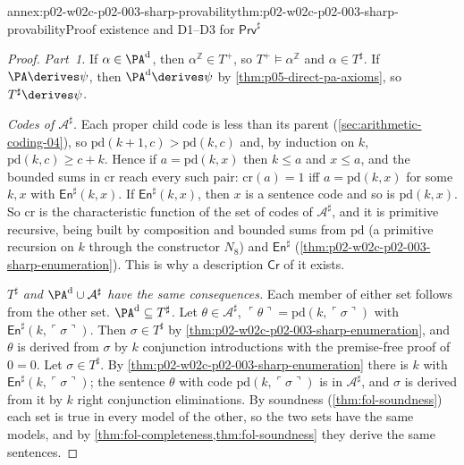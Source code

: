 \begin{annexitem}{annex:p02-w02c-p02-003-sharp-provability}{thm:p02-w02c-p02-003-sharp-provability}{Proof existence and D1--D3 for \(\mathsf{Prv}^{\sharp}\)}
\begin{proof}
\emph{Part~1.}  If \(\alpha\in\PA^{\rm d}\), then
\(\alpha^{\mathbb Z}\in T^{+}\), so \(T^{+}\models\alpha^{\mathbb Z}\) and
\(\alpha\in T^{\sharp}\).  If \(\PA\derives\psi\), then
\(\PA^{\rm d}\derives\psi\) by \cref{thm:p05-direct-pa-axioms}, so
\(T^{\sharp}\derives\psi\).

\emph{Codes of \(\mathcal A^{\sharp}\).}  Each proper child code is less
than its parent (\cref{sec:arithmetic-coding-04}), so
\(\mathrm{pd}(k+1,c)>\mathrm{pd}(k,c)\) and, by induction on \(k\),
\(\mathrm{pd}(k,c)\ge c+k\).  Hence if \(a=\mathrm{pd}(k,x)\) then
\(k\le a\) and \(x\le a\), and the bounded sums in \(\mathrm{cr}\) reach
every such pair: \(\mathrm{cr}(a)=1\) iff \(a=\mathrm{pd}(k,x)\) for some
\(k,x\) with \(\mathsf{En}^{\sharp}(k,x)\).  If \(\mathsf{En}^{\sharp}(k,x)\),
then \(x\) is a sentence code and so is \(\mathrm{pd}(k,x)\).  So \(\mathrm{cr}\)
is the characteristic function of the set of codes of \(\mathcal A^{\sharp}\),
and it is primitive recursive, being built by composition and bounded sums
from \(\mathrm{pd}\) (a primitive recursion on \(k\) through the constructor
\(N_8\)) and \(\mathsf{En}^{\sharp}\)
(\cref{thm:p02-w02c-p02-003-sharp-enumeration}).  This is why a
description \(\mathsf{Cr}\) of it exists.

\emph{\(T^{\sharp}\) and \(\PA^{\rm d}\cup\mathcal A^{\sharp}\) have the
same consequences.}  Each member of either set follows from the other set.
\(\PA^{\rm d}\subseteq T^{\sharp}\).  Let \(\theta\in\mathcal A^{\sharp}\),
\(\ulcorner\theta\urcorner=\mathrm{pd}(k,\ulcorner\sigma\urcorner)\) with
\(\mathsf{En}^{\sharp}(k,\ulcorner\sigma\urcorner)\).  Then
\(\sigma\in T^{\sharp}\) by \cref{thm:p02-w02c-p02-003-sharp-enumeration},
and \(\theta\) is derived from \(\sigma\) by \(k\) conjunction
introductions with the premise-free proof of \(0=0\).  Let
\(\sigma\in T^{\sharp}\).  By \cref{thm:p02-w02c-p02-003-sharp-enumeration}
there is \(k\) with \(\mathsf{En}^{\sharp}(k,\ulcorner\sigma\urcorner)\);
the sentence \(\theta\) with code \(\mathrm{pd}(k,\ulcorner\sigma\urcorner)\)
is in \(\mathcal A^{\sharp}\), and \(\sigma\) is derived from it by \(k\)
right conjunction eliminations.  By soundness
(\cref{thm:fol-soundness}) each set is true in every model of the other, so
the two sets have the same models, and by
\cref{thm:fol-completeness,thm:fol-soundness} they derive the same
sentences.


\end{proof}
\end{annexitem}
